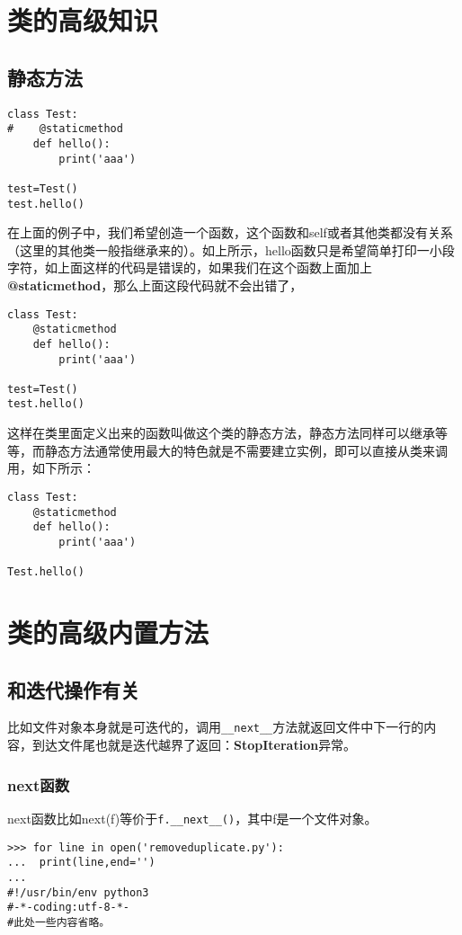 \documentclass[12pt,oneside]{book}
\begin{document}
\begin{common-format}
\chapter{类的高级知识}
\section{静态方法}
\begin{Verbatim}
class Test:
#    @staticmethod
    def hello():
        print('aaa')

test=Test()
test.hello()
\end{Verbatim}
在上面的例子中，我们希望创造一个函数，这个函数和self或者其他类都没有关系（这里的其他类一般指继承来的）。如上所示，hello函数只是希望简单打印一小段字符，如上面这样的代码是错误的，如果我们在这个函数上面加上\textbf{@staticmethod}，那么上面这段代码就不会出错了，

\begin{Verbatim}
class Test:
    @staticmethod
    def hello():
        print('aaa')

test=Test()
test.hello()
\end{Verbatim}
这样在类里面定义出来的函数叫做这个类的静态方法，静态方法同样可以继承等等，而静态方法通常使用最大的特色就是不需要建立实例，即可以直接从类来调用，如下所示：
\begin{Verbatim}
class Test:
    @staticmethod
    def hello():
        print('aaa')

Test.hello()
\end{Verbatim}

\chapter{类的高级内置方法}

\section{和迭代操作有关}
比如文件对象本身就是可迭代的，调用\verb+__next__+方法就返回文件中下一行的内容，到达文件尾也就是迭代越界了返回：\textbf{StopIteration}异常。

\subsection{next函数}
next函数比如next(f)等价于\verb+f.__next__()+，其中f是一个文件对象。

\begin{Verbatim}
>>> for line in open('removeduplicate.py'):
...  print(line,end='')
... 
#!/usr/bin/env python3
#-*-coding:utf-8-*-
#此处一些内容省略。
    

\end{Verbatim}
\end{common-format}
\end{document}
